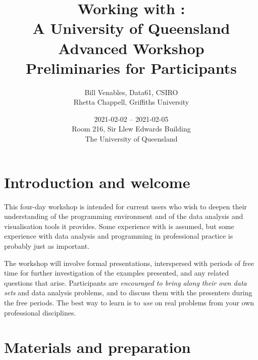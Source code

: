 \documentclass[12pt]{article}
\title{Working with \Rlogo:\\
  A University of Queensland Advanced Workshop\\[10pt]
Preliminaries for Participants}
\author{Bill Venables, Data61, CSIRO\\
Rhetta Chappell, Griffiths University}
\date{2021-02-02 -- 2021-02-05\\[10pt]
  Room 216, Sir Llew Edwards Building\\[5pt]
  The University of Queensland}
\begin{document}
\maketitle

\section{Introduction and welcome}
\label{sec:welcome}

This four-day workshop is intended for current \R users who wish to
deepen their understanding of the programming environment and of the
data analysis and visualisation tools it provides.  Some experience
with \R is assumed, but some experience with data analysis and
programming in professional practice is probably just as important.

The workshop will involve formal presentations, interspersed with
periods of free time for further investigation of the examples
presented, and any related questions that arise.  Participants are
\emph{encouraged to bring along their own data sets} and data analysis
problems, and to discuss them with the presenters during the free
periods.  The best way to learn \R is to \emph{use} \R on real
problems from your own professional disciplines.


\section{Materials and preparation}
\label{sec:prep}
\end{document}
